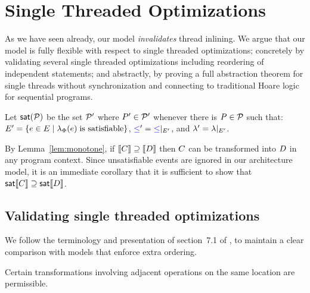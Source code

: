 \section{Single Threaded Optimizations}
\label{sec:opt}

As we have seen already, our model {\em invalidates} thread inlining.  We argue that our model is fully flexible with respect to single threaded optimizations; concretely by validating several 
single threaded optimizations including reordering of independent statements; and abstractly, by proving a full abstraction
theorem for single threads without synchronization and connecting to traditional Hoare logic for sequential programs. 



Let $\mathsf{sat}(\mathcal{P})$ be the set $\mathcal{P}'$ where $P'\in\mathcal{P}'$ whenever
there is $P\in\mathcal{P}$ such that:
$E' = \{e \in E\mid \lambda_{\Phi}(e)\;\text{is satisfiable}\}$,
${\mathrel{{\color{blue}\leq}}'} = {\mathrel{{\color{blue}\leq}}}\mathbin{|}_{E'}$,
and
${\lambda'} = {\lambda}\mathbin{|}_{E'}$.

By Lemma~\ref{lem:monotone}, if $\llbracket C\rrbracket \supseteq \llbracket D\rrbracket$
then $C$ can be transformed into $D$ in any program context.  Since
unsatisfiable events are ignored in our architecture model, it is
an immediate corollary that it is sufficient to show that
$\mathsf{sat}\llbracket C\rrbracket \supseteq \mathsf{sat}\llbracket D\rrbracket$.



\subsection{Validating single threaded optimizations}
We follow the terminology and presentation of section~7.1 of
\citet{Dolan:2018:BDR:3192366.3192421}, to maintain a clear comparison with
models that enforce extra ordering.

Certain transformations involving adjacent operations on the same location
are permissible. 
 
